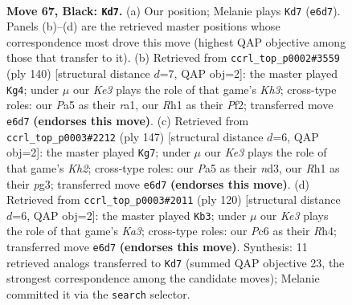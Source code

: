 \documentclass[11pt]{article}
\begin{document}
\clearpage

\begin{figure}[p]\centering
\begin{subfigure}{0.46\textwidth}\centering
\resizebox{\linewidth}{!}{%
\newchessgame
\chessboard[
  setfen={8/8/2p1k3/p2p4/8/4K3/8/7r b - - 5 67},
  showmover=false,
  pgfstyle=straightmove, color=movearrow, markmove={e6-d7}
]}
\caption{}
\end{subfigure}\hfill
\begin{subfigure}{0.46\textwidth}\centering
\resizebox{\linewidth}{!}{%
\newchessgame
\chessboard[
  setfen={7R/8/6k1/8/7P/7K/5P2/r7 w - - 17 71},
  showmover=false,
  pgfstyle=straightmove, color=movearrow, markmove={h3-g4}
]}
\caption{}
\end{subfigure}
\\[4pt]
\begin{subfigure}{0.46\textwidth}\centering
\resizebox{\linewidth}{!}{%
\newchessgame
\chessboard[
  setfen={8/7k/7p/5K2/8/1p1N2P1/8/8 b - - 8 74},
  showmover=false,
  pgfstyle=straightmove, color=movearrow, markmove={h7-g7}
]}
\caption{}
\end{subfigure}\hfill
\begin{subfigure}{0.46\textwidth}\centering
\resizebox{\linewidth}{!}{%
\newchessgame
\chessboard[
  setfen={8/8/1k6/8/P6R/K1P5/8/4r3 w - - 9 61},
  showmover=false,
  pgfstyle=straightmove, color=movearrow, markmove={a3-b3}
]}
\caption{}
\end{subfigure}
\caption{\textbf{Move 67, Black: \texttt{Kd7}.} (a) Our position; Melanie plays \texttt{Kd7} (\texttt{e6d7}). Panels (b)--(d) are the retrieved master positions whose correspondence most drove this move (highest QAP objective among those that transfer to it). (b) Retrieved from \texttt{ccrl\_top\_p0002\#3559} (ply 140) [structural distance $d$=7, QAP obj=2]: the master played \texttt{Kg4}; under $\mu$ our \emph{Ke3} plays the role of that game's \emph{Kh3}; cross-type roles: our \emph{P}a5 as their \emph{r}a1, our \emph{R}h1 as their \emph{P}f2; transferred move \texttt{e6d7} \textbf{(endorses this move)}. (c) Retrieved from \texttt{ccrl\_top\_p0003\#2212} (ply 147) [structural distance $d$=6, QAP obj=2]: the master played \texttt{Kg7}; under $\mu$ our \emph{Ke3} plays the role of that game's \emph{Kh2}; cross-type roles: our \emph{P}a5 as their \emph{n}d3, our \emph{R}h1 as their \emph{p}g3; transferred move \texttt{e6d7} \textbf{(endorses this move)}. (d) Retrieved from \texttt{ccrl\_top\_p0003\#2011} (ply 120) [structural distance $d$=6, QAP obj=2]: the master played \texttt{Kb3}; under $\mu$ our \emph{Ke3} plays the role of that game's \emph{Ka3}; cross-type roles: our \emph{P}c6 as their \emph{R}h4; transferred move \texttt{e6d7} \textbf{(endorses this move)}. Synthesis: 11 retrieved analogs transferred to \texttt{Kd7} (summed QAP objective 23, the strongest correspondence among the candidate moves); Melanie committed it via the \texttt{search} selector.}
\label{fig:thought-m133}
\end{figure}
\end{document}
